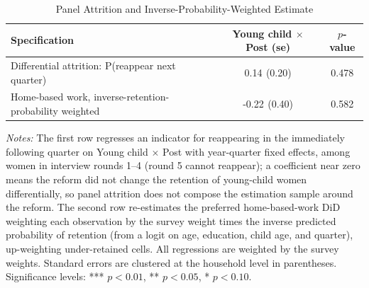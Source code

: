 \begin{table}[H]\centering
\caption{Panel Attrition and Inverse-Probability-Weighted Estimate}
\label{tab:attrition}\small
\begin{tabular}{lcc}
\toprule
Specification & Young child $\times$ Post (se) & $p$-value \\
\midrule
Differential attrition: P(reappear next quarter) & 0.14$^{}$ (0.20) & 0.478 \\
Home-based work, inverse-retention-probability weighted & -0.22$^{}$ (0.40) & 0.582 \\
\bottomrule\end{tabular}
\par\vspace{3pt}\footnotesize\raggedright \textit{Notes:} The first row regresses an indicator for reappearing in the immediately following quarter on Young child $\times$ Post with year-quarter fixed effects, among women in interview rounds 1--4 (round 5 cannot reappear); a coefficient near zero means the reform did not change the retention of young-child women differentially, so panel attrition does not compose the estimation sample around the reform. The second row re-estimates the preferred home-based-work DiD weighting each observation by the survey weight times the inverse predicted probability of retention (from a logit on age, education, child age, and quarter), up-weighting under-retained cells. All regressions are weighted by the survey weights. Standard errors are clustered at the household level in parentheses. Significance levels: *** $p<0.01$, ** $p<0.05$, * $p<0.10$.
\end{table}
